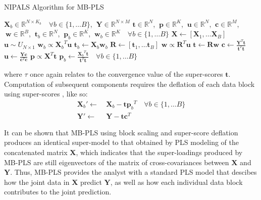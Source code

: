 \begin{algorithm}[H]
\caption{NIPALS Algorithm for MB-PLS}
\label{algorithm.3.5}
\begin{algorithmic}[1]
\REQUIRE $\mathbf{X}_b \in \mathbb{R}^{N \times K_b}
          \quad \forall b \in \{1, \dots B\}$,%
       $\:\mathbf{Y} \in \mathbb{R}^{N \times M}$
\ENSURE $\mathbf{t} \in \mathbb{R}^N$,%
      $\:\mathbf{p} \in \mathbb{R}^K$,%
      $\:\mathbf{u} \in \mathbb{R}^N$,%
      $\:\mathbf{c} \in \mathbb{R}^M$,%
      $\:\mathbf{w} \in \mathbb{R}^B$,%
      $\:\mathbf{t}_b \in \mathbb{R}^N$,%
      $\:\mathbf{p}_b \in \mathbb{R}^K$,%
      $\:\mathbf{w}_b \in \mathbb{R}^K
       \quad \forall b \in \{1, \dots B\}$
\STATE $\mathbf{X} \gets [\mathbf{X}_1, \dots \mathbf{X}_B]$
\STATE $\mathbf{u} \sim U_{N \times 1}$ 
\REPEAT
    \STATE $\mathbf{w}_b \propto {\mathbf{X}_b}^T \mathbf{u}$
    \STATE $\mathbf{t}_b \gets \mathbf{X}_b \mathbf{w}_b$
  \ENDFOR
  \STATE $\mathbf{R} \gets [\mathbf{t}_1, \dots \mathbf{t}_B]$
  \STATE $\mathbf{w} \propto \mathbf{R}^T \mathbf{u}$
  \STATE $\mathbf{t} \gets \mathbf{R} \mathbf{w}$
  \STATE $\mathbf{c} \gets \tfrac{\mathbf{Y}^T \mathbf{t}}
                                 {\mathbf{t}^T \mathbf{t}}$
  \STATE $\mathbf{u} \gets \tfrac{\mathbf{Y} \mathbf{c}}
                                 {\mathbf{c}^T \mathbf{c}}$
\UNTIL{$\tau < \varepsilon$}
\STATE $\mathbf{p} \propto \mathbf{X}^T \mathbf{t}$
\STATE $\mathbf{p}_b \gets \tfrac{{\mathbf{X}_b}^T \mathbf{t}}
                                 {\mathbf{t}^T \mathbf{t}}
        \quad \forall b \in \{1, \dots B\}$
\end{algorithmic}
\end{algorithm}

\begin{doublespace}
where $\tau$ once again relates to the convergence value of the super-scores
$\mathbf{t}$. Computation of subsequent components requires the deflation of
each data block using super-scores \cite{westerhuis:jchemo1997}, like so:
\begin{align}
\mathbf{X}_b' \gets& \: \mathbf{X}_b - \mathbf{t} {\mathbf{p}_b}^T
 \quad \forall b \in \{1, \dots B\} \\
\mathbf{Y}' \gets& \: \mathbf{Y} - \mathbf{t} \mathbf{c}^T
\end{align}

It can be shown \cite{westerhuis:jchemo1998} that MB-PLS using block scaling
and super-score deflation produces an identical super-model to that obtained
by PLS modeling of the concatenated matrix $\mathbf{X}$, which indicates that
the super-loadings produced by MB-PLS are still eigenvectors of the matrix of
cross-covariances between $\mathbf{X}$ and $\mathbf{Y}$. Thus, MB-PLS provides
the analyst with a standard PLS model that descibes how the joint data in
$\mathbf{X}$ predict $\mathbf{Y}$, as well as how each individual data block
contributes to the joint prediction.
\end{doublespace}

